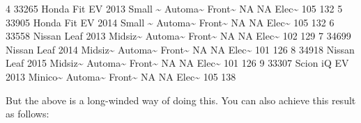 \documentclass[
]{book}
\newenvironment{Shaded}{\begin{snugshade}}{\end{snugshade}}
\newcommand{\ConstantTok}[1]{\textcolor[rgb]{0.00,0.00,0.00}{#1}}
\newcommand{\DecValTok}[1]{\textcolor[rgb]{0.00,0.00,0.81}{#1}}
\newcommand{\FunctionTok}[1]{\textcolor[rgb]{0.00,0.00,0.00}{#1}}
\newcommand{\NormalTok}[1]{#1}
\newcommand{\SpecialCharTok}[1]{\textcolor[rgb]{0.00,0.00,0.00}{#1}}
\begin{document}
\begin{Shaded}
\begin{Highlighting}[]
\DecValTok{4} \DecValTok{33265}\NormalTok{ Honda  Fit EV  }\DecValTok{2013}\NormalTok{ Small }\SpecialCharTok{\textasciitilde{}}\NormalTok{ Automa}\SpecialCharTok{\textasciitilde{}}\NormalTok{ Front}\SpecialCharTok{\textasciitilde{}}    \ConstantTok{NA}    \ConstantTok{NA}\NormalTok{ Elec}\SpecialCharTok{\textasciitilde{}}   \DecValTok{105}   \DecValTok{132}
\DecValTok{5} \DecValTok{33905}\NormalTok{ Honda  Fit EV  }\DecValTok{2014}\NormalTok{ Small }\SpecialCharTok{\textasciitilde{}}\NormalTok{ Automa}\SpecialCharTok{\textasciitilde{}}\NormalTok{ Front}\SpecialCharTok{\textasciitilde{}}    \ConstantTok{NA}    \ConstantTok{NA}\NormalTok{ Elec}\SpecialCharTok{\textasciitilde{}}   \DecValTok{105}   \DecValTok{132}
\DecValTok{6} \DecValTok{33558}\NormalTok{ Nissan Leaf    }\DecValTok{2013}\NormalTok{ Midsiz}\SpecialCharTok{\textasciitilde{}}\NormalTok{ Automa}\SpecialCharTok{\textasciitilde{}}\NormalTok{ Front}\SpecialCharTok{\textasciitilde{}}    \ConstantTok{NA}    \ConstantTok{NA}\NormalTok{ Elec}\SpecialCharTok{\textasciitilde{}}   \DecValTok{102}   \DecValTok{129}
\DecValTok{7} \DecValTok{34699}\NormalTok{ Nissan Leaf    }\DecValTok{2014}\NormalTok{ Midsiz}\SpecialCharTok{\textasciitilde{}}\NormalTok{ Automa}\SpecialCharTok{\textasciitilde{}}\NormalTok{ Front}\SpecialCharTok{\textasciitilde{}}    \ConstantTok{NA}    \ConstantTok{NA}\NormalTok{ Elec}\SpecialCharTok{\textasciitilde{}}   \DecValTok{101}   \DecValTok{126}
\DecValTok{8} \DecValTok{34918}\NormalTok{ Nissan Leaf    }\DecValTok{2015}\NormalTok{ Midsiz}\SpecialCharTok{\textasciitilde{}}\NormalTok{ Automa}\SpecialCharTok{\textasciitilde{}}\NormalTok{ Front}\SpecialCharTok{\textasciitilde{}}    \ConstantTok{NA}    \ConstantTok{NA}\NormalTok{ Elec}\SpecialCharTok{\textasciitilde{}}   \DecValTok{101}   \DecValTok{126}
\DecValTok{9} \DecValTok{33307}\NormalTok{ Scion  iQ EV   }\DecValTok{2013}\NormalTok{ Minico}\SpecialCharTok{\textasciitilde{}}\NormalTok{ Automa}\SpecialCharTok{\textasciitilde{}}\NormalTok{ Front}\SpecialCharTok{\textasciitilde{}}    \ConstantTok{NA}    \ConstantTok{NA}\NormalTok{ Elec}\SpecialCharTok{\textasciitilde{}}   \DecValTok{105}   \DecValTok{138}
\end{Highlighting}
\end{Shaded}

But the above is a long-winded way of doing this. You can also achieve this result as follows:

\begin{Shaded}
\end{Shaded}
\end{document}
